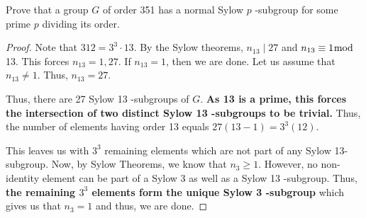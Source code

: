 \begin{exercise}
Prove that a group $G$ of order 351 has a normal Sylow $p$ -subgroup for some prime $p$ dividing its order.
\end{exercise}
\begin{proof}
Note that $312=3^3 \cdot 13$. By the Sylow theorems, $n_{13} \mid 27$ and $n_{13} \equiv 1 \bmod$ 13. This forces $n_{13}=1,27$. If $n_{13}=1$, then we are done. Let us assume that $n_{13} \neq 1$. Thus, $n_{13}=27$.

Thus, there are 27 Sylow 13 -subgroups of $G$. \textbf{As 13 is a prime, this forces the intersection of two distinct Sylow 13 -subgroups to be trivial.} Thus, the number of elements having order 13 equals $27(13-1)=3^3(12)$.

This leaves us with $3^3$ remaining elements which are not part of any Sylow 13-subgroup. Now, by Sylow Theorems, we know that $n_3 \geq 1$. However, no non-identity element can be part of a Sylow 3 as well as a Sylow 13 -subgroup. Thus, \textbf{the remaining $3^3$ elements form the unique Sylow 3 -subgroup} which gives us that $n_3=1$ and thus, we are done.
\end{proof}


